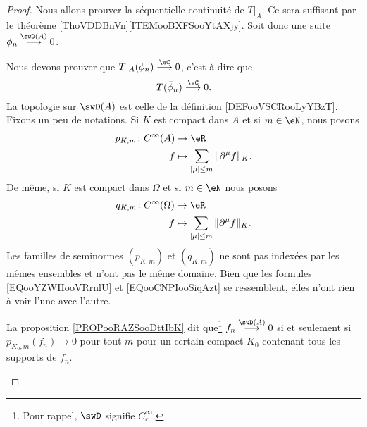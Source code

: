 \begin{proof}
	Nous allons prouver la séquentielle continuité de \( T|_A\). Ce sera suffisant par le théorème \ref{ThoVDDBnVn}\ref{ITEMooBXFSooYtAXjy}. Soit donc une suite \( \phi_n\stackrel{\swD(A)}{\longrightarrow}0\).

	\begin{subproof}
		\spitem[Débroussailler]
		Nous devons prouver que \( T|_A(\phi_n)\stackrel{\eC}{\longrightarrow}0\), c'est-à-dire que
		\begin{equation}
			T(\bar \phi_n)\stackrel{\eC}{\longrightarrow}0.
		\end{equation}
		\spitem[Notations]
		La topologie sur \( \swD(A)\) est celle de la définition \ref{DEFooVSCRooLyYBzT}. Fixons un peu de notations. Si \( K\) est compact dans \( A\) et si \( m\in\eN\), nous posons
		\begin{equation}        \label{EQooYZWHooVRrnlU}
			\begin{aligned}
				p_{K,m}\colon  C^{\infty}(A) & \to \eR                                                \\
				f                            & \mapsto \sum_{| \mu |\leq m}\| \partial^{\mu}f \|_{K}.
			\end{aligned}
		\end{equation}
		De même, si \( K\) est compact dans \( \Omega\) et si \( m\in \eN\) nous posons
		\begin{equation}        \label{EQooCNPIooSiqAzt}
			\begin{aligned}
				q_{K,m}\colon  C^{\infty}(\Omega) & \to \eR                                                \\
				f                                 & \mapsto \sum_{| \mu |\leq m}\| \partial^{\mu}f \|_{K}.
			\end{aligned}
		\end{equation}
		Les familles de seminormes \( (p_{K,m})\) et \( (q_{K,m})\) ne sont pas indexées par les mêmes ensembles et n'ont pas le même domaine. Bien que les formules \eqref{EQooYZWHooVRrnlU} et \eqref{EQooCNPIooSiqAzt} se ressemblent, elles n'ont rien à voir l'une avec l'autre.


		La proposition \ref{PROPooRAZSooDttIbK} dit que\footnote{Pour rappel, \( \swD\) signifie \( C^{\infty}_c\).} \( f_n\stackrel{\swD(A)}{\longrightarrow}0\) si et seulement si \( p_{K_0,m}(f_n)\to 0\) pour tout \( m\) pour un certain compact \( K_0\) contenant tous les supports de \( f_n\).


\end{subproof}
\end{proof}
